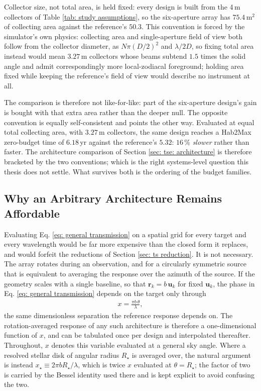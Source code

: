 \documentclass[12pt,a4paper]{article}
\numberwithin{equation}{section}
\numberwithin{figure}{section}
\numberwithin{table}{section}
\begin{document}
Collector size, not total area, is held fixed: every design is built from the 4\,m collectors of Table \ref{tab: study assumptions}, so the six-aperture array has $75.4$\,m$^2$ of collecting area against the reference's $50.3$. This convention is forced by the simulator's own physics: collecting area and single-aperture field of view both follow from the collector diameter, as $N\pi(D/2)^2$ and $\lambda/2D$, so fixing total area instead would mean $3.27$\,m collectors whose beams subtend $1.5$ times the solid angle and admit correspondingly more local-zodiacal foreground; holding area fixed while keeping the reference's field of view would describe no instrument at all.

The comparison is therefore not like-for-like: part of the six-aperture design's gain is bought with that extra area rather than the deeper null. The opposite convention is equally self-consistent and points the other way. Evaluated at equal total collecting area, with $3.27$\,m collectors, the same design reaches a Hab2Max zero-budget time of $6.18$\,yr against the reference's $5.32$: $16\,\%$ \textit{slower} rather than faster. The architecture comparison of Section \ref{sec: tse: architecture} is therefore bracketed by the two conventions; which is the right systems-level question this thesis does not settle. What survives both is the ordering of the budget families.

\subsection{Why an Arbitrary Architecture Remains Affordable} \label{sec: methods: affordable}
Evaluating Eq. \ref{eq: general transmission} on a spatial grid for every target and every wavelength would be far more expensive than the closed form it replaces, and would forfeit the reductions of Section \ref{sec: ts reduction}. It is not necessary. The array rotates during an observation, and for a circularly symmetric source that is equivalent to averaging the response over the azimuth of the source. If the geometry scales with a single baseline, so that $\mathbf{r}_k=b\,\mathbf{u}_k$ for fixed $\mathbf{u}_k$, the phase in Eq. \ref{eq: general transmission} depends on the target only through
\begin{align}
x=\frac{\pi b\,\theta}{\lambda},
\end{align}
the same dimensionless separation the reference response depends on. The rotation-averaged response of any such architecture is therefore a one-dimensional function of $x$, and can be tabulated once per design and interpolated thereafter. Throughout, $x$ denotes this variable evaluated at a general sky angle. Where a resolved stellar disk of angular radius $R_\star$ is averaged over, the natural argument is instead $x_\star\equiv2\pi bR_\star/\lambda$, which is twice $x$ evaluated at $\theta=R_\star$; the factor of two is carried by the Bessel identity used there and is kept explicit to avoid confusing the two.
\end{document}
